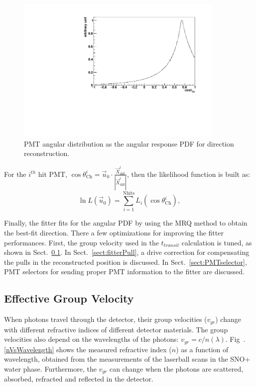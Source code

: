 \begin{figure}[!htb]
	\centering
	\includegraphics[width=10cm]{MPW_angularPDF.pdf}
	\caption{PMT angular distribution as the angular response PDF for direction reconstruction.}
	\label{fig:MPW_angularPDF}
\end{figure}

For the $i^{th}$ hit PMT, $\cos\theta^i_{\mathrm{Ch}}=\vec{u}_0\cdot\frac{\vec{X}^i_{{\mathrm{diff}}}}{|\vec{X}^i_{{\mathrm{diff}}}|}$, then the likelihood function is built as:
\begin{equation}
\ln L(\vec{u}_0)=\sum_{i=1}^{{\mathrm{Nhits}}}L_i(\cos\theta_{\mathrm{Ch}}^i),
\end{equation}

Finally, the fitter fits for the angular PDF by using the MRQ method to obtain the best-fit direction. There a few optimizations for improving the fitter performances. First, the group velocity used in the $t_{transit}$ calculation is tuned, as shown in Sect.~\ref{sect:tuneGroupVelocity}. In Sect.~\ref{sect:fitterPull}, a drive correction for compensating the pulls in the reconstructed position is discussed. In Sect.~\ref{sect:PMTselector}, PMT selectors for sending proper PMT information to the fitter are discussed. 

\subsection{Effective Group Velocity}\label{sect:tuneGroupVelocity}
When photons travel through the detector, their group velocities ($v_{gr}$) change with different refractive indices of different detector materials. The group velocities also depend on the wavelengths of the photons: $v_{gr}=c/n(\lambda)$. Fig~.\ref{nVsWavelength} shows the measured refractive index ($n$) as a function of wavelength, obtained from the measurements of the laserball scans in the SNO+ water phase\cite{laserball_groupVelocity}. Furthermore, the $v_{gr}$ can change when the photons are scattered, absorbed, refracted and reflected in the detector.


